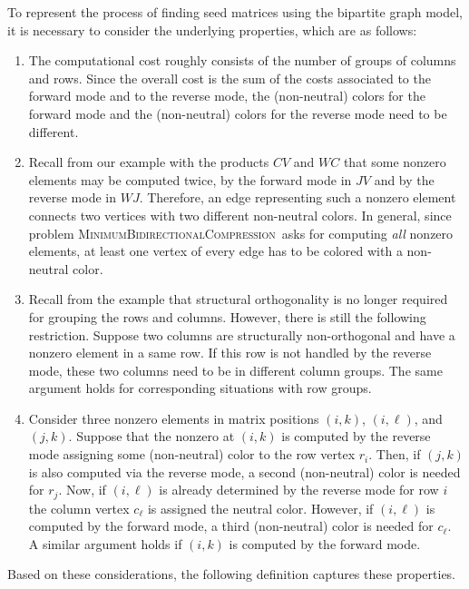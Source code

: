 \documentclass[12pt, oneside]{book}
\newcommand{\MinBidCom}{\textsc{MinimumBidirectionalCompression}}
\begin{document}
To represent the process of finding seed matrices using the bipartite graph model, it is
necessary to consider the underlying properties, which are as follows:
\begin{enumerate}
\item The computational cost roughly consists of the number of groups of columns and
    rows. Since the overall cost is the sum of the costs associated to the forward mode
    and to the reverse mode, the (non-neutral) colors for the forward mode and the
    (non-neutral) colors for the reverse mode need to be different.

\item Recall from our example with the products $CV$ and $WC$ that some nonzero
    elements may be computed twice, by the forward mode in $JV$ and by the reverse mode
    in $WJ$. Therefore, an edge representing such a nonzero element connects two
    vertices with two different non-neutral colors. In general, since problem
    \MinBidCom\ asks for computing \emph{all} nonzero elements, at least one vertex of
    every edge has to be colored with a non-neutral color.

\item Recall from the example that structural orthogonality is no longer required for
    grouping the rows and columns. However, there is still the following restriction.
    Suppose two columns are structurally non-orthogonal and have a nonzero element in a
    same row. If this row is not handled by the reverse mode, these two columns need to
    be in different column groups. The same argument holds for corresponding situations
    with row groups.

\item Consider three nonzero elements in matrix positions $(i,k)$, $(i,\ell)$, and
    $(j,k)$. Suppose that the nonzero at $(i,k)$ is computed by the reverse mode
    assigning some (non-neutral) color to the row vertex $r_i$. Then, if $(j,k)$ is
    also computed via the reverse mode, a second (non-neutral) color is needed for
    $r_j$. Now, if $(i,\ell)$ is already determined by the reverse mode for row $i$ the
    column vertex $c_\ell$ is assigned the neutral color. However, if $(i,\ell)$ is
    computed by the forward mode, a third (non-neutral) color is needed for $c_\ell$. A
    similar argument holds if $(i,k)$ is computed by the forward mode.

\end{enumerate}

Based on these considerations, the following definition captures these properties.
\end{document}
